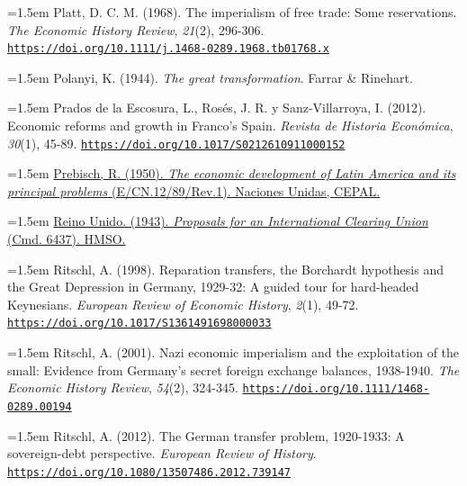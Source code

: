 \documentclass[10pt,a4paper]{article}
\begin{document}
{\sloppy\noindent\hangindent=1.5em Platt, D. C. M. (1968). The imperialism of free trade: Some reservations. \textit{The Economic History Review}, \textit{21}(2), 296-306. \href{https://doi.org/10.1111/j.1468-0289.1968.tb01768.x}{\nolinkurl{https://doi.org/10.1111/j.1468-0289.1968.tb01768.x}}\par}

\noindent\hangindent=1.5em Polanyi, K. (1944). \textit{The great transformation}. Farrar \& Rinehart.

{\sloppy\noindent\hangindent=1.5em Prados de la Escosura, L., Rosés, J. R. y Sanz-Villarroya, I. (2012). Economic reforms and growth in Franco's Spain. \textit{Revista de Historia Económica}, \textit{30}(1), 45-89. \href{https://doi.org/10.1017/S0212610911000152}{\nolinkurl{https://doi.org/10.1017/S0212610911000152}}\par}

{\sloppy\noindent\hangindent=1.5em \href{https://hdl.handle.net/11362/29973}{Prebisch, R. (1950). \textit{The economic development of Latin America and its principal problems} (E/CN.12/89/Rev.1). Naciones Unidas, CEPAL.}\par}

{\sloppy\noindent\hangindent=1.5em \href{https://api.parliament.uk/historic-hansard/lords/1943/may/18/international-clearing-union}{Reino Unido. (1943). \textit{Proposals for an International Clearing Union} (Cmd. 6437). HMSO.}\par}

{\sloppy\noindent\hangindent=1.5em Ritschl, A. (1998). Reparation transfers, the Borchardt hypothesis and the Great Depression in Germany, 1929-32: A guided tour for hard-headed Keynesians. \textit{European Review of Economic History}, \textit{2}(1), 49-72. \href{https://doi.org/10.1017/S1361491698000033}{\nolinkurl{https://doi.org/10.1017/S1361491698000033}}\par}

{\sloppy\noindent\hangindent=1.5em Ritschl, A. (2001). Nazi economic imperialism and the exploitation of the small: Evidence from Germany's secret foreign exchange balances, 1938-1940. \textit{The Economic History Review}, \textit{54}(2), 324-345. \href{https://doi.org/10.1111/1468-0289.00194}{\nolinkurl{https://doi.org/10.1111/1468-0289.00194}}\par}

{\sloppy\noindent\hangindent=1.5em Ritschl, A. (2012). The German transfer problem, 1920-1933: A sovereign-debt perspective. \textit{European Review of History}. \href{https://doi.org/10.1080/13507486.2012.739147}{\nolinkurl{https://doi.org/10.1080/13507486.2012.739147}}\par}
\end{document}

